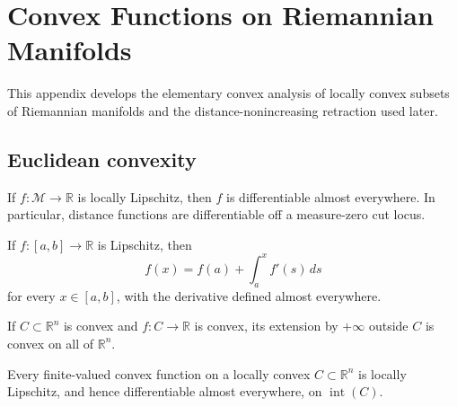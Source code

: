 \chapter{Convex Functions on Riemannian Manifolds}
\label{app:chow-iii-convex-functions-riemannian-manifolds}

\providecommand{\Lip}{\operatorname{Lip}}
\providecommand{\dil}{\operatorname{dil}}
\providecommand{\R}{\mathbb R}
\providecommand{\M}{\mathcal M}
\providecommand{\C}{\mathcal C}
\providecommand{\T}{\widetilde T}
\providecommand{\Xzero}{\mathfrak X_0}
\providecommand{\Vzero}{\mathcal V_0}
\providecommand{\dC}{d_C}

This appendix develops the elementary convex analysis of locally convex subsets
of Riemannian manifolds and the distance-nonincreasing retraction used later.

\section{Euclidean convexity}

\begin{proposition}
\label{prop:chow-iii-h2-rademacher}
If $f:\M\to\R$ is locally Lipschitz, then $f$ is differentiable almost everywhere.
In particular, distance functions are differentiable off a measure-zero cut locus.
\end{proposition}

\begin{lemma}
\label{lem:chow-iii-h3-lipschitz-ftc}
If $f:[a,b]\to\R$ is Lipschitz, then
\[
f(x)=f(a)+\int_a^x f'(s)\,ds
\]
for every $x\in[a,b]$, with the derivative defined almost everywhere.
\end{lemma}

\begin{remark}
\label{rem:chow-iii-h4-extended-convex-extension}
If $C\subset\R^n$ is convex and $f:C\to\R$ is convex, its extension by $+\infty$
outside $C$ is convex on all of $\R^n$.
\end{remark}

\begin{proposition}
\label{prop:chow-iii-h5-convex-lipschitz}
Every finite-valued convex function on a locally convex $C\subset\R^n$ is locally
Lipschitz, and hence differentiable almost everywhere, on $\operatorname{int}(C)$.
\end{proposition}

